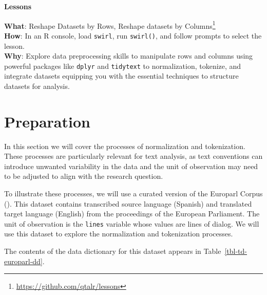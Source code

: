 \documentclass[
  letterpaper,
]{latex/krantz}
\theoremstyle{definition}
\theoremstyle{remark}
\DeclareRobustCommand{\href}[2]{#2\footnote{\url{#1}}}
\begin{document}
\begin{tcolorbox}[enhanced jigsaw, toprule=.15mm, breakable, colback=white, opacityback=0, leftrule=.75mm, bottomrule=.15mm, colframe=quarto-callout-color-frame, left=2mm, arc=.35mm, rightrule=.15mm]

\textbf{ Lessons}

\textbf{What}: \href{https://github.com/qtalr/lessons}{Reshape Datasets
by Rows, Reshape datasets by Columns}\\
\textbf{How}: In an R console, load \texttt{swirl}, run
\texttt{swirl()}, and follow prompts to select the lesson.\\
\textbf{Why}: Explore data preprocessing skills to manipulate rows and
columns using powerful packages like \texttt{dplyr} and
\texttt{tidytext} to normalization, tokenize, and integrate datasets
equipping you with the essential techniques to structure datasets for
analysis.

\end{tcolorbox}

\section{Preparation}\label{sec-td-preparation}

In this section we will cover the processes of normalization and
tokenization. These processes are particularly relevant for text
analysis, as text conventions can introduce unwanted variability in the
data and the unit of observation may need to be adjusted to align with
the research question.

To illustrate these processes, we will use a curated version of the
Europarl Corpus (). This dataset
contains transcribed source language (Spanish) and translated target
language (English) from the proceedings of the European Parliament. The
unit of observation is the \texttt{lines} variable whose values are
lines of dialog. We will use this dataset to explore the normalization
and tokenization processes.

The contents of the data dictionary for this dataset appears in
Table~\ref{tbl-td-europarl-dd}.
\end{document}
